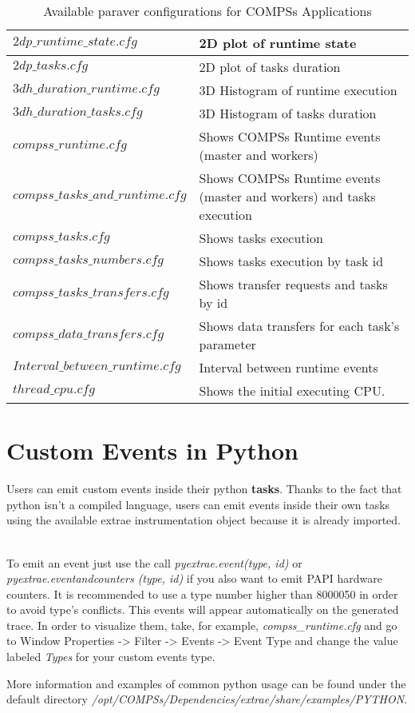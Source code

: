 \bgroup
  \def\arraystretch{1.5}
  \begin{table}[h]
    \begin{center}
      \begin{tabular}{| p{} | p{} |}
	\hline
	$2dp\_runtime\_state.cfg$		& 2D plot of runtime state \\ \hline
	$2dp\_tasks.cfg$			& 2D plot of tasks duration \\ \hline
	$3dh\_duration\_runtime.cfg$		& 3D Histogram of runtime execution \\ \hline
	$3dh\_duration\_tasks.cfg$		& 3D Histogram of tasks duration \\ \hline
	$compss\_runtime.cfg$ 			& Shows COMPSs Runtime events (master and workers) \\ \hline
	$compss\_tasks\_and\_runtime.cfg$ 	& Shows COMPSs Runtime events (master and workers) and tasks execution \\ \hline
	$compss\_tasks.cfg$ 			& Shows tasks execution \\ \hline
	$compss\_tasks\_numbers.cfg$ 		& Shows tasks execution by task id \\ \hline
	$compss\_tasks\_transfers.cfg$ 		& Shows transfer requests and tasks by id \\ \hline
	$compss\_data\_transfers.cfg$ 		& Shows data transfers for each task's parameter \\ \hline
	$Interval\_between\_runtime.cfg$ 	& Interval between runtime events \\ \hline
	$thread\_cpu.cfg$			& Shows the initial executing CPU. \\ \hline
      \end{tabular}
      \caption{Available paraver configurations for COMPSs Applications}
      \label{tab:paraver_configs}
    \end{center}
  \end{table}
\egroup

\section{Custom Events in Python}

Users can emit custom events inside their python \textbf{tasks}. Thanks to the fact that python isn't a compiled language, 
users can emit events inside their own tasks using the available extrae instrumentation object because it is already imported.
~ \newline

To emit an event just use the call \textit{pyextrae.event(type, id)} or \textit{pyextrae.eventandcounters
(type, id)} if you also want to emit PAPI hardware counters. It is recommended to use a type number higher than 8000050 in order 
to avoid type's conflicts. This events will appear automatically on the generated trace. In order to visualize them, take, 
for example, \textit{compss\_runtime.cfg} and go to Window Properties -> Filter -> Events -> Event Type and change the 
value labeled \textit{Types} for your custom events type.
~ \newline

More information and examples of common python usage can be found under the default directory 
\textit{/opt/COMPSs/Dependencies/extrae/share/examples/PYTHON}.

